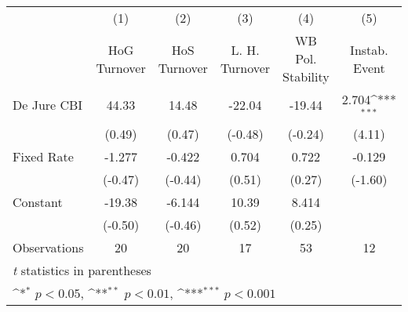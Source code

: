 \begin{table}[htbp]\centering
\def\sym#1{\ifmmode^{#1}\else\(^{#1}\)\fi}
\caption{\label{hiKfivs3}}
\begin{tabular}{l*{5}{c}}
\toprule
                                        &\multicolumn{1}{c}{(1)}&\multicolumn{1}{c}{(2)}&\multicolumn{1}{c}{(3)}&\multicolumn{1}{c}{(4)}&\multicolumn{1}{c}{(5)}\\
                                        &\multicolumn{1}{c}{HoG Turnover}&\multicolumn{1}{c}{HoS Turnover}&\multicolumn{1}{c}{L. H. Turnover}&\multicolumn{1}{c}{WB Pol. Stability}&\multicolumn{1}{c}{Instab. Event}\\
\midrule
De Jure CBI                             &    44.33         &    14.48         &   -22.04         &   -19.44         &    2.704\sym{***}\\
                                        &   (0.49)         &   (0.47)         &  (-0.48)         &  (-0.24)         &   (4.11)         \\
\addlinespace
Fixed Rate                              &   -1.277         &   -0.422         &    0.704         &    0.722         &   -0.129         \\
                                        &  (-0.47)         &  (-0.44)         &   (0.51)         &   (0.27)         &  (-1.60)         \\
\addlinespace
Constant                                &   -19.38         &   -6.144         &    10.39         &    8.414         &                  \\
                                        &  (-0.50)         &  (-0.46)         &   (0.52)         &   (0.25)         &                  \\
\midrule
Observations                            &       20         &       20         &       17         &       53         &       12         \\
\bottomrule
\multicolumn{6}{l}{\footnotesize \textit{t} statistics in parentheses}\\
\multicolumn{6}{l}{\footnotesize \sym{*} \(p<0.05\), \sym{**} \(p<0.01\), \sym{***} \(p<0.001\)}\\
\end{tabular}
\end{table}
